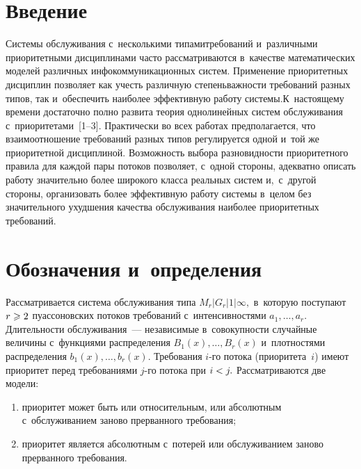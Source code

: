   
\vspace*{-6pt}



\thispagestyle{headings}

\begin{multicols}{2}

\label{st\stat}

\section{Введение}

Системы обслуживания с~несколькими типами\linebreak требований и~различными приоритетными дис\-цип\-ли\-на\-ми 
часто рассматриваются в~качестве математических моделей различных инфокоммуникационных сис\-тем. 
Применение приоритетных \mbox{дисциплин} позволяет как учесть  различную степень\linebreak важности требований разных типов, так и~обеспечить 
наиболее эффективную работу сис\-те\-мы.\linebreak К~настоящему времени достаточно полно развита теория однолинейных сис\-тем обслуживания с~приоритетами~[1--3]. 
Практически во всех работах предполагается, что взаимоотношение требований разных типов регулируется одной и~той же 
приоритетной дисциплиной. Возможность выбора разновидности приоритетного правила для каждой пары потоков позволяет, с~одной стороны, 
адекватно описать работу значительно более широкого класса реальных сис\-тем и,~с~другой стороны, организовать более эффективную работу сис\-те\-мы 
в~целом без значительного ухудшения качества обслуживания наиболее приоритетных требований.

\vspace*{-12pt}

\section{Обозначения и~определения}

\vspace*{-3pt}

Рассматривается система обслуживания типа $M_r|G_r|1|\infty,$ в~которую поступают $r\hm\geqslant 2$ пуассоновских потоков требований с~интенсивностями 
$a_1,\ldots,a_r.$ Длительности обслуживания~--- независимые в~совокупности случайные величины с~функциями распределения $B_1(x),\ldots,B_r(x)$ 
и~плотностями распределения $b_1(x),\ldots,b_r(x).$ Требования $i$-го потока (приоритета~$i$) имеют приоритет перед требованиями $j$-го потока при $i\hm<j.$ 
Рассматриваются две модели: 
\begin{enumerate}[(1)]
\item приоритет может быть или относительным, или абсолютным с~обслуживанием заново прерванного требования;
\item приоритет является абсолютным с~потерей или обслуживанием заново прерванного требования.
\end{enumerate}


\end{multicols}

